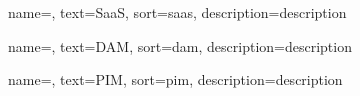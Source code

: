  {
    name=,
    text=SaaS,
    sort=saas,
    description={description}
}

 {
    name=,
    text=DAM,
    sort=dam,
    description={description}
}

 {
    name=,
    text=PIM,
    sort=pim,
    description={description}
}



